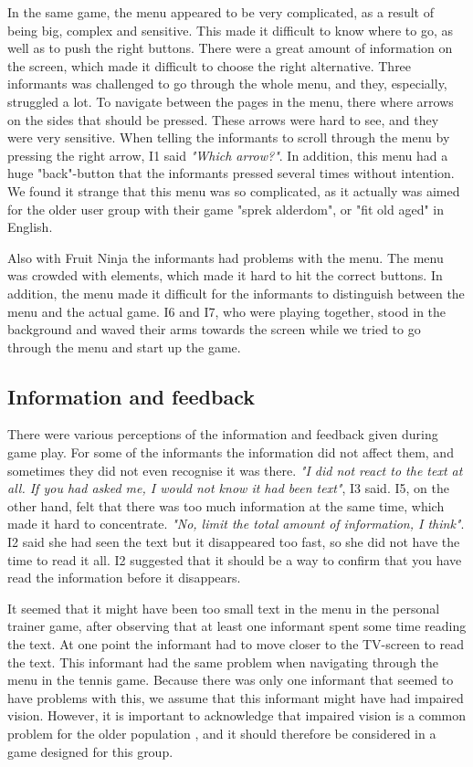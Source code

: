 In the same game, the menu appeared to be very complicated, as a result of being big, complex and sensitive. This made it difficult to know where to go, as well as to push the right buttons. There were a great amount of information on the screen, which made it difficult to choose the right alternative. Three informants was challenged to go through the whole menu, and they, especially, struggled a lot. To navigate between the pages in the menu, there where arrows on the sides that should be pressed. These arrows were hard to see, and they were very sensitive. When telling the informants to scroll through the menu by pressing the right arrow, I1 said \emph{"Which arrow?"}. In addition, this menu had a huge "back"-button that the informants pressed several times without intention. We found it strange that this menu was so complicated, as it actually was aimed for the older user group with their game "sprek alderdom", or "fit old aged" in English.  

Also with Fruit Ninja the informants had problems with the menu. The menu was crowded with elements, which made it hard to hit the correct buttons. In addition, the menu made it difficult for the informants to distinguish between the menu and the actual game. I6 and I7, who were playing together, stood in the background and waved their arms towards the screen while we tried to go through the menu and start up the game. 

\subsection{Information and feedback}
There were various perceptions of the information and feedback given during game play. For some of the informants the information did not affect them, and sometimes they did not even recognise it was there. \emph{"I did not react to the text at all. If you had asked me, I would not know it had been text"}, I3 said. I5, on the other hand, felt that there was too much information at the same time, which made it hard to concentrate. \emph{"No, limit the total amount of information, I think"}.  I2 said she had seen the text but it disappeared too fast, so she did not have the time to read it all. I2 suggested that it should be a way to confirm that you have read the information before it disappears. 

It seemed that it might have been too small text in the menu in the personal trainer game, after observing that at least one informant spent some time reading the text. At one point the informant had to move closer to the TV-screen to read the text. This informant had the same problem when navigating through the menu in the tennis game. Because there was only one informant that seemed to have problems with this, we assume that this informant might have had impaired vision. However, it is important to acknowledge that impaired vision is a common problem for the older population \cite{ijsselsteijn2007digital}, and it should therefore be considered in a game designed for this group. 

